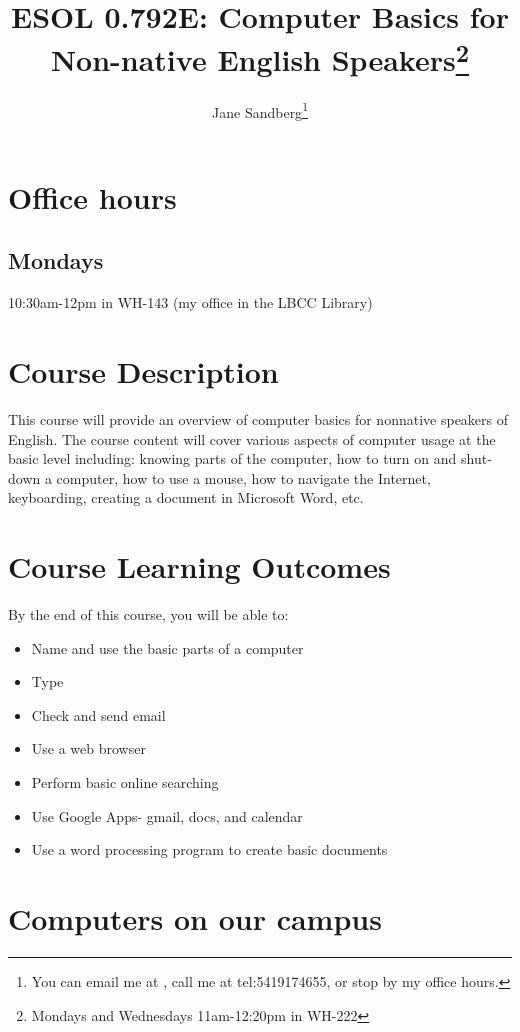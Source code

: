 \documentclass[12pt,article,oneside]{memoir}
\author{Jane Sandberg\thanks{You can email me at \htmladdnormallink{sandbej at linnbenton dot edu}{mailto:sandbej@linnbenton.edu}, call me at \htmladdnormallink{(541) 917 4655}	{tel:5419174655}, or stop by my office hours.}}
\title{ESOL 0.792E: Computer Basics for Non-native English Speakers\thanks{Mondays and Wednesdays 11am-12:20pm in WH-222}}
\begin{document}
\renewcommand{\labelitemi}{$\triangleright$}
\setcounter{secnumdepth}{0}
\tightlists


\maketitle

\begin{htmlonly}
\tableofcontents
\end{htmlonly}
\section{Office hours}

\subsection{Mondays}
10:30am-12pm in WH-143 (my office in the LBCC Library)

\section{Course Description}
This course will provide an overview of computer basics for non­native speakers of English. The course content will cover various aspects of computer usage at the basic level including: knowing parts of the computer, how to turn on and shut­down a computer, how to use a mouse, how to navigate the Internet, keyboarding, creating a document in Microsoft Word, etc.

\section{Course Learning Outcomes}
By the end of this course, you will be able to:
\begin{itemize}
 \item Name and use the basic parts of a computer
 \item Type
 \item Check and send email
 \item Use a web browser
 \item Perform basic online searching
 \item Use Google Apps- gmail, docs, and calendar
 \item Use a word processing program to create basic documents

\end{itemize}

\section{Computers on our campus}
\end{document}
